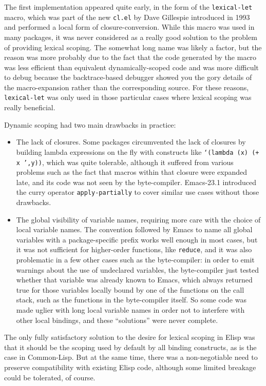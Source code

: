 \documentclass[format=acmsmall, review=false, screen=true]{acmart}
\newcommand \Elisp {Elisp}
\begin{document}
The first implementation appeared quite early, in the form of the
\texttt{lexical-let} macro, which was part of the new \texttt{cl.el} by Dave
Gillespie  introduced in 1993 and performed
a local form of closure-conversion.
While this macro was used in many packages, it was never considered as
a really good solution to the problem of providing lexical scoping.
The somewhat long name was likely a factor, but the reason was more probably
due to the fact that the code generated by the macro was less efficient than
equivalent dynamically-scoped code and was more difficult to debug because
the backtrace-based debugger showed you the gory details of the
macro-expansion rather than the corresponding source.  For these reasons,
\texttt{lexical-let} was only used in those particular cases where lexical
scoping was really beneficial.

Dynamic scoping had two main drawbacks in practice:
\begin{itemize}
\item The lack of closures.  Some packages circumvented the lack of closures
  by building lambda expressions on the fly with constructs like
  \texttt{`(lambda (x) (+ x ',y))}, which was quite tolerable, although it
  suffered from various problems such as the fact that macros within that
  closure were expanded late, and its code was not seen by the
  byte-compiler.  Emacs-23.1 introduced the curry operator
  \texttt{apply-partially} to cover similar use cases without
  those drawbacks.
\item The global visibility of variable names, requiring more care with the
  choice of local variable names.  The convention followed by Emacs to name
  all global variables with a package-specific prefix works well enough in
  most cases, but it was not sufficient for higher-order functions, like
  \texttt{reduce}, and it was also problematic in a few other cases such as
  the byte-compiler: in order to emit warnings about the use of undeclared
  variables, the byte-compiler just tested whether that variable was already
  known to Emacs, which always returned true for those variables locally
  bound by one of the functions on the call stack, such as the functions in
  the byte-compiler itself.  So some code was made uglier with long local
  variable names in order not to interfere with other local bindings, and
  these ``solutions'' were never complete.
\end{itemize}

The only fully satisfactory solution to the desire for lexical scoping in
\Elisp{} was that it should be the scoping used by default by all binding
constructs, as is the case in Common-Lisp.  But at the same time, there was
a non-negotiable need to preserve compatibility with existing \Elisp{} code,
although some limited breakage could be tolerated, of course.
\end{document}
